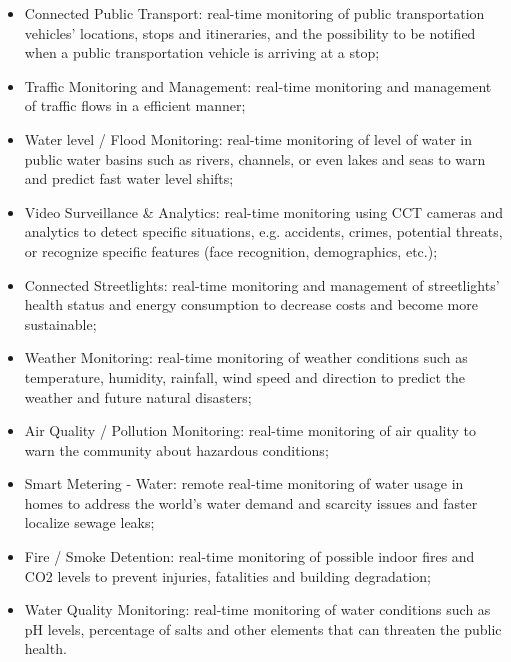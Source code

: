 \begin{itemize}
    \item Connected Public Transport: real-time monitoring of public transportation vehicles' locations, stops and itineraries, and the possibility to be notified when a public transportation vehicle is arriving at a stop;
    \item Traffic Monitoring and Management: real-time monitoring and management of traffic flows in a efficient manner;
    \item Water level / Flood Monitoring: real-time monitoring of level of water in public water basins such as rivers, channels, or even lakes and seas to warn and predict fast water level shifts;
    \item Video Surveillance \& Analytics: real-time monitoring using \gls{CCT} cameras and analytics to detect specific situations, e.g. accidents, crimes, potential threats, or recognize specific features (face recognition, demographics, etc.);
    \item Connected Streetlights: real-time monitoring and management of streetlights' health status and energy consumption to decrease costs and become more sustainable;
    \item Weather Monitoring: real-time monitoring of weather conditions such as temperature, humidity, rainfall, wind speed and direction to predict the weather and future natural disasters;
    \item Air Quality / Pollution Monitoring: real-time monitoring of air quality to warn the community about hazardous conditions;
    \item Smart Metering - Water: remote real-time monitoring of water usage in homes to address the world's water demand and scarcity issues and faster localize sewage leaks;
    \item Fire / Smoke Detention: real-time monitoring of possible indoor fires and CO2 levels to prevent injuries, fatalities and building degradation;
    \item Water Quality Monitoring: real-time monitoring of water conditions such as pH levels, percentage of salts and other elements that can threaten the public health.
\end{itemize}

